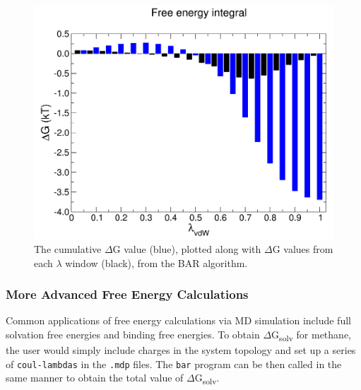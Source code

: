 \documentclass[9pt,tutorial,pubversion]{livecoms}
\begin{document}
\begin{figure}[h!]
\centering
\includegraphics{free_energy_plot_barint}
\caption{The cumulative $\Delta$G value (blue), plotted along with $\Delta$G values from each $\lambda$ window (black), from the BAR algorithm.}
\label{free_energy_plot_barint_fig}
\end{figure}

\subsubsection{More Advanced Free Energy Calculations} \label{fes_advanced}

Common applications of free energy calculations via MD simulation include full solvation free energies and binding free energies. To obtain $\Delta$G\textsubscript{solv} for methane, the user would simply include charges in the system topology and set up a series of \texttt{coul-lambdas} in the \texttt{.mdp} files. The \texttt{bar} program can be then called in the same manner to obtain the total value of $\Delta$G\textsubscript{solv}.
\end{document}
